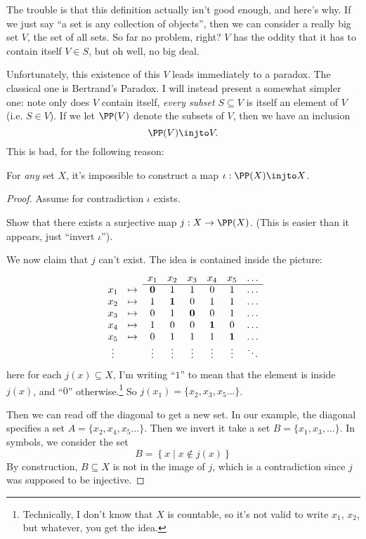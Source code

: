 The trouble is that this definition actually isn't good enough, and here's why.
If we just say ``a set is any collection of objects'',
then we can consider a really big set $V$, the set of all sets.
So far no problem, right?
$V$ has the oddity that it has to contain itself $V \in S$,
but oh well, no big deal.

Unfortunately, this existence of this $V$ leads immediately to a paradox.
The classical one is Bertrand's Paradox.
I will instead present a somewhat simpler one:
note only does $V$ contain itself, \emph{every subset $S \subseteq V$} is itself
an element of $V$ (i.e. $S \in V$).
If we let $\PP(V)$ denote the subsets of $V$, then we have an inclusion
\[ \PP(V) \injto V. \]
This is bad, for the following reason:
\begin{lemma}
	\label{lem:cantor_diag}
	For \emph{any} set $X$, it's impossible to construct a
	map $\iota : \PP(X) \injto X$.
\end{lemma}
\begin{proof}
	Assume for contradiction $\iota$ exists.
	\begin{exercise}
		Show that there exists a surjective map $j : X \to \PP(X)$.
		(This is easier than it appears, just ``invert $\iota$'').
	\end{exercise}
	We now claim that $j$ can't exist.
	The idea is contained inside the picture:
	\[
		\begin{array}{cccccccc}
			&& x_1 & x_2 & x_3 & x_4 & x_5 & \dots \\ \cline{3-8}
			x_1 & \mapsto & \mathbf0 & 1 & 1 & 0 & 1 & \dots \\
			x_2 & \mapsto & 1 & \mathbf1 & 0 & 1 & 1 & \dots \\
			x_3 & \mapsto & 0 & 1 & \mathbf0 & 0 & 1 & \dots \\
			x_4 & \mapsto & 1 & 0 & 0 & \mathbf1 & 0 & \dots \\
			x_5 & \mapsto & 0 & 1 & 1 & 1 & \mathbf1 & \dots \\
			\vdots && \vdots & \vdots & \vdots & \vdots & \vdots & \ddots
		\end{array}
	\]
	here for each $j(x) \subseteq X$, I'm writing ``$1$'' to mean that
	the element is inside $j(x)$, and ``$0$'' otherwise.\footnote{
		Technically, I don't know that $X$ is countable,
		so it's not valid to write $x_1$, $x_2$, but whatever,
		you get the idea.}
	So $j(x_1) = \{x_2, x_3, x_5 \dots\}$.

	Then we can read off the diagonal to get a new set.
	In our example, the diagonal specifies a set
	$A = \{x_2, x_4, x_5 \dots\}$.
	Then we invert it take a set $B = \{x_1, x_3, \dots\}$.
	In symbols, we consider the set
	\[ B = \left\{ x \mid x \notin j(x) \right\} \]
	By construction, $B \subseteq X$ is not in the image of $j$,
	which is a contradiction since $j$ was supposed to be injective.
\end{proof}


